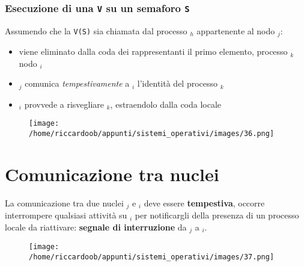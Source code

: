 \subsubsection{Esecuzione di una \texttt{V} su un semaforo \texttt{S}}
Assumendo che la \texttt{V(S)} sia chiamata dal processo $_h$ appartenente al nodo $_j$:
\begin{itemize}
    \item viene eliminato dalla coda dei rappresentanti il primo elemento, processo $_k$ nodo $_i$
    \item {}$_j$ comunica \textit{tempestivamente} a $_i$ l'identità del processo $_k$
    \item {}$_i$ provvede a risvegliare $_k$, estraendolo dalla coda locale
\end{itemize}

\begin{figure}[H]
    \centering
    \texttt{[image: /home/riccardoob/appunti/sistemi\_operativi/images/36.png]}
\end{figure}

\section{Comunicazione tra nuclei}
La comunicazione tra due nuclei $_j$ e $_i$ deve essere \textbf{tempestiva}, occorre interrompere qualsiasi attività su $_i$ per notificargli della presenza di un processo locale da riattivare: \textbf{segnale di interruzione} da $_j$ a $_i$.

\begin{figure}[H]
    \centering
    \texttt{[image: /home/riccardoob/appunti/sistemi\_operativi/images/37.png]}
\end{figure}

